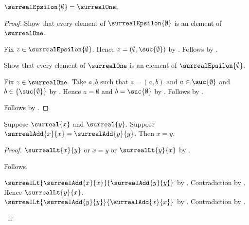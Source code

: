 \begin{proposition}\label{surreal_epsilon_zero}
    $\surrealEpsilon{\emptyset}=\surrealOne$.
\end{proposition}
\begin{proof}
    Show that every element of $\surrealEpsilon{\emptyset}$ is an
        element of $\surrealOne$.
    \begin{subproof}
        Fix $z\in\surrealEpsilon{\emptyset}$.
        Hence $z=(\emptyset,\suc{\emptyset})$
            by .
        Follows by
            .
    \end{subproof}
    Show that every element of $\surrealOne$ is an element of
        $\surrealEpsilon{\emptyset}$.
    \begin{subproof}
        Fix $z\in\surrealOne$.
        Take $a,b$ such that $z=(a,b)$ and
            $a\in\suc{\emptyset}$ and
            $b\in\{\suc{\emptyset}\}$
            by .
        Hence $a=\emptyset$ and $b=\suc{\emptyset}$
            by .
        Follows by .
    \end{subproof}
    Follows by .
\end{proof}

\begin{lemma}\label{surreal_double_injective}
    Suppose $\surreal{x}$ and $\surreal{y}$.
    Suppose $\surrealAdd{x}{x}=\surrealAdd{y}{y}$.
    Then $x=y$.
\end{lemma}
\begin{proof}
    $\surrealLt{x}{y}$ or $x=y$ or $\surrealLt{y}{x}$
        by .
    \begin{byCase}
            Follows.
            \begin{byCase}
                    $\surrealLt{\surrealAdd{x}{x}}
                        {\surrealAdd{y}{y}}$
                        by .
                    Contradiction by
                        .
                    Hence $\surrealLt{y}{x}$.
                    $\surrealLt{\surrealAdd{y}{y}}
                        {\surrealAdd{x}{x}}$
                        by .
                    Contradiction by
                        .
            \end{byCase}
    \end{byCase}
\end{proof}

